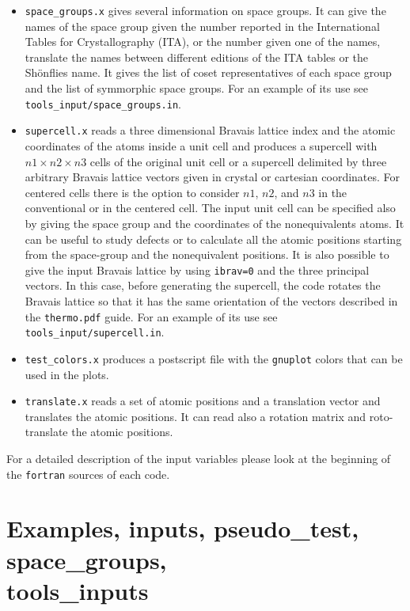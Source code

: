 \documentclass[12pt,a4paper]{article}
\begin{document}
\begin{itemize}
\item \texttt{space\_groups.x} gives several information on space groups.
It can give the names of the space group given the number reported in
the International Tables for Crystallography (ITA), or
the number given one of the names, translate the names between different
editions of the ITA tables or the Sh\"onflies name. It gives the list 
of coset representatives of each space group and the list of symmorphic 
space groups.
For an example of its use see \texttt{tools\_input/space\_groups.in}.

\item \texttt{supercell.x} reads a three dimensional
Bravais lattice index and the atomic coordinates of the atoms inside a unit
cell and produces a supercell with $n1 \times n2 \times n3$ cells of 
the original
unit cell or a supercell delimited by three arbitrary Bravais lattice
vectors given in crystal or cartesian coordinates. For centered cells 
there is the option to consider $n1$, $n2$,
and $n3$ in the conventional or in the centered cell.
The input unit cell can be specified also by giving the space group and
the coordinates of the nonequivalents atoms.
It can be useful to study defects or to calculate all the 
atomic positions starting from the space-group and the 
nonequivalent positions.
It is also possible to give the input Bravais lattice by using
\texttt{ibrav=0} and the three principal vectors. In this case,
before generating the supercell, the code rotates the Bravais
lattice so that it has the same orientation of the vectors described
in the \texttt{thermo.pdf} guide.
For an example of its use see \texttt{tools\_input/supercell.in}.

\item \texttt{test\_colors.x} produces a postscript file with the 
\texttt{gnuplot} colors that can be used in the plots.   

\item \texttt{translate.x} reads a set of atomic positions and a translation
vector and translates the atomic positions. It can read also a rotation matrix 
and roto-translate the atomic positions.

\end{itemize}

For a detailed description of the input variables please look at the beginning 
of the \texttt{fortran} sources of each code.

\newpage
\section{\color{coral}Examples, inputs, pseudo\_test, space\_groups,\\ 
tools\_inputs}
\end{document}
